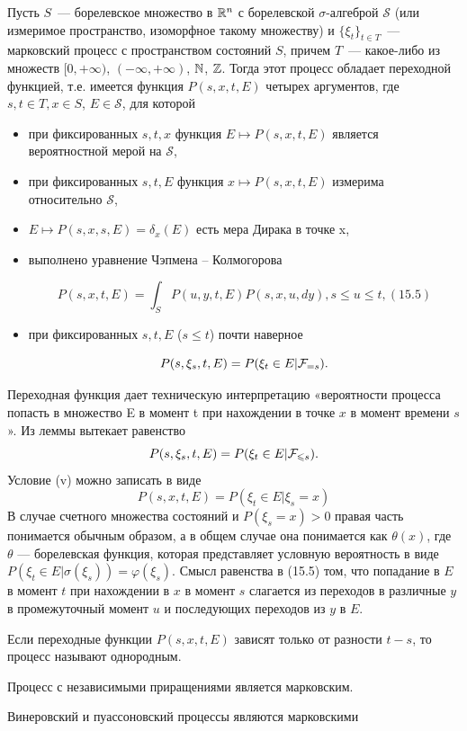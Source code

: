 \begin{theorem}
    Пусть $S$~--- борелевское множество в $\mathbb{R}^n$ с борелевской $\sigma$-алгеброй $\mathcal{S}$ (или измеримое пространство, изоморфное такому множеству) и $\{\xi_t\}_{t \in T}$~--- марковский процесс с пространством состояний $S$, причем $T$~--- какое-либо из множеств $[0, +\infty)$, $(-\infty, +\infty)$, $\mathbb{N}$, $\mathbb{Z}$. Тогда этот процесс обладает переходной функцией, т.е. имеется функция $P(s, x, t, E)$ четырех аргументов, где $s, t \in T, x \in S$, $E \in \mathcal{S}$, для которой
    \begin{itemize}
        \item[(i)] при фиксированных $s, t, x$ функция $E \mapsto P(s, x, t, E)$ является вероятностной мерой на $\mathcal{S}$,
        \item [(ii)] при фиксированных $s, t, E$ функция $x \mapsto P(s, x, t, E)$ измерима относительно $\mathcal{S}$,
        \item[(iii)] $E \mapsto P(s, x, s, E) = \delta_x(E)$ есть мера Дирака в точке x,
        \item[(iv)] выполнено уравнение Чэпмена – Колмогорова

        \[ P(s, x, t, E) = \int_S P(u, y, t, E)P(s, x, u, dy), s \leq u \leq t, (15.5) \]
        \item[(v)] при фиксированных $s, t, E$ ($s \leq t$) почти наверное
        
        \[ P(s, \xi_s, t, E) = P(\xi_t \in E|\mathcal{F}_{=s}). \]
    \end{itemize}
\end{theorem}

\begin{note}
    Переходная функция дает техническую интерпретацию «вероятности процесса попасть в множество E в момент t при нахождении в точке $x$ в момент времени $s$».
    Из леммы вытекает равенство
    \[ P(s, \xi_s, t, E) = P(\xi_t \in E|\mathcal{F}_{\leqslant s}). \]
    Условие (v) можно записать в виде
    \[ P(s, x, t, E) = P(\xi_t \in E|\xi_s = x) \]
    В случае счетного множества состояний и $P(\xi_s = x) > 0$ правая часть понимается обычным образом, а в общем случае она понимается как $\theta(x)$, где $\theta$ — борелевская функция, которая представляет условную вероятность в виде $P(\xi_t \in E|\sigma(\xi_s)) = \varphi(\xi_s)$.
    Смысл равенства в (15.5) том, что попадание в $E$ в момент $t$ при нахождении в $x$ в момент $s$ слагается из переходов в различные $y$ в промежуточный момент $u$ и последующих переходов из $y$ в $E$.
\end{note}

\begin{definition}
    Если переходные функции $P(s, x, t, E)$ зависят только от разности $t - s$, то процесс называют однородным.
\end{definition}

\begin{theorem}
    Процесс с независимыми приращениями является марковским.
\end{theorem}

\begin{corollary}
    Винеровский и пуассоновский процессы являются марковскими
\end{corollary}